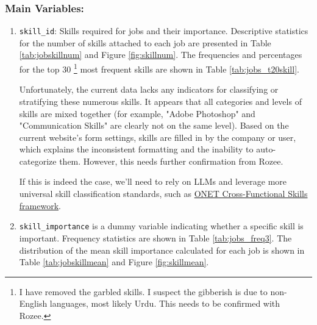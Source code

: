 \documentclass[12pt]{article}
\begin{document}
\subsubsection*{Main Variables:}
    \begin{enumerate}
        \item \texttt{skill\_id}: Skills required for jobs and their importance. Descriptive statistics for the number of skills attached to each job are presented in Table \ref{tab:jobskillnum} and Figure \ref{fig:skillnum}. The frequencies and percentages for the top 30 \footnote{I have removed the garbled skills. I suspect the gibberish is due to non-English languages, most likely Urdu. This needs to be confirmed with Rozee.} most frequent skills are shown in Table \ref{tab:jobs_t20skill}.

Unfortunately, the current data lacks any indicators for classifying or stratifying these numerous skills. It appears that all categories and levels of skills are mixed together (for example, "Adobe Photoshop" and "Communication Skills" are clearly not on the same level). Based on the current website's form settings, skills are filled in by the company or user, which explains the inconsistent formatting and the inability to auto-categorize them. However, this needs further confirmation from Rozee. 

If this is indeed the case, we'll need to rely on LLMs and leverage more universal skill classification standards, such as \href{https://www.onetonline.org/find/descriptor/browse/2.B}{ONET Cross-Functional Skills framework}.


        
        
       \item  \texttt{skill\_importance} is a dummy variable indicating whether a specific skill is important. Frequency statistics are shown in Table \ref{tab:jobs_freq3}. The distribution of the mean skill importance calculated for each job is shown in Table \ref{tab:jobskillmean} and Figure \ref{fig:skillmean}.
    \end{enumerate}
\end{document}
